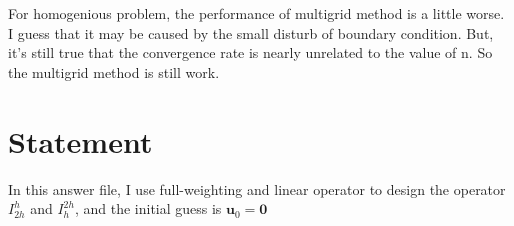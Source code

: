 \documentclass[UTF8]{ctexart}
\theoremstyle{plain}
\theoremstyle{definition}
\theoremstyle{remark}
\begin{document}
For homogenious problem, the performance of multigrid method is a little worse. I guess that it may be caused by the small disturb of boundary condition. But, it's still true that the convergence rate is nearly unrelated to the value of n. So the multigrid method is still work. 
\section{Statement}
In this answer file, I use full-weighting and linear operator to design the operator 
$I_{2h}^{h}$ and $I_{h}^{2h}$, and the initial guess is $\textbf{u}_{0}=\textbf{0}$
\end{document}
